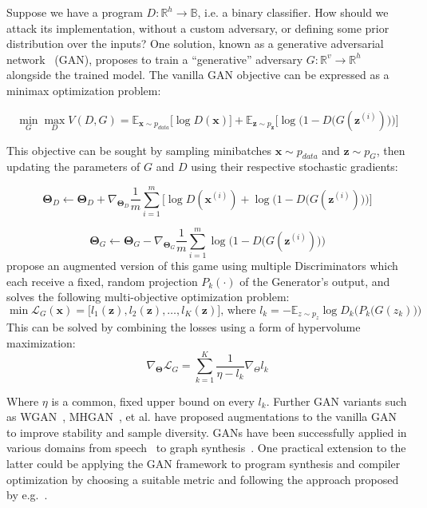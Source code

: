 Suppose we have a program $D: \mathbb{R}^h\rightarrow\mathbb{B}$, i.e. a binary classifier. How should we attack its implementation, without a custom adversary, or defining some prior distribution over the inputs? One solution, known as a generative adversarial network~\citep{goodfellow2014gan} (GAN), proposes to train a ``generative'' adversary $G: \mathbb{R}^v\rightarrow\mathbb{R}^h$ alongside the trained model. The vanilla GAN objective can be expressed as a minimax optimization problem:

\begin{equation}
\min_G \max_D V(D, G) = \mathbb{E}_{\mathbf x \sim p_{data}}\big[\log D(\mathbf x)\big] + \mathbb{E}_{\mathbf z \sim p_{\mathbf z}}\Big[\log\Big(1 - D\big(G(\mathbf z^{(i)})\big)\Big)\Big]
\end{equation}

This objective can be sought by sampling minibatches $\mathbf x \sim p_{data}$ and $\mathbf z \sim p_{G}$, then updating the parameters of $G$ and $D$ using their respective stochastic gradients:

\begin{equation}
\bm\Theta_D \leftarrow \bm\Theta_D + \nabla_{\bm\Theta_D}\frac{1}{m}\sum_{i=1}^m\Big[\log D(\mathbf x^{(i)}) + \log\Big(1 - D\big(G(\mathbf z^{(i)})\big)\Big)\Big]
\end{equation}

\begin{equation}
\bm\Theta_G \leftarrow \bm\Theta_G - \nabla_{\bm\Theta_G}\frac{1}{m}\sum_{i=1}^m \log\Big(1 - D\big(G(\mathbf z^{(i)})\big)\Big)
\end{equation}
%
\citet{albuquerque2019hgan} propose an augmented version of this game using multiple Discriminators which each receive a fixed, random projection $P_k(\cdot)$ of the Generator's output, and solves the following multi-objective optimization problem:
%
\begin{equation} \label{eq:moo_spec}
\min \mathbf{\mathcal{L}}_G(\mathbf x) = \big[l_1(\mathbf z), l_2(\mathbf z), \ldots, l_K(\mathbf z)\big] \text{, where } l_k = -\mathbb E_{z \sim p_z} \log D_k\Big(P_k\big(G(z_k)\big)\Big)
\end{equation}
%
This can be solved by combining the losses using a form of hypervolume maximization:
%
\begin{equation}
\nabla_{\bm\Theta} \mathcal{L}_G = \sum_{k=1}^K \frac{1}{\eta - l_k}\nabla_\Theta l_k
\end{equation}

Where $\eta$ is a common, fixed upper bound on every $l_k$. Further GAN variants such as WGAN~\citep{arjovsky2017wgan}, MHGAN~\citep{turner2019mhgan}, et al. have proposed augmentations to the vanilla GAN to improve stability and sample diversity. GANs have been successfully applied in various domains from speech~\citep{donahue2019wavegan} to graph synthesis~\citep{wang2018graphgan}. One practical extension to the latter could be applying the GAN framework to program synthesis and compiler optimization by choosing a suitable metric and following the approach proposed by e.g.~\citet{adams2019learning, mendis2019compiler}.

